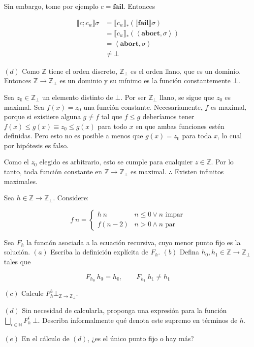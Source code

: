 \documentclass[a4paper, 12pt]{article}
\begin{document}
Sin embargo, tome por ejemplo $c = \textbf{fail}$. Entonces 

\begin{align*}
  \llbracket c;c_w \rrbracket\sigma 
  &= \llbracket c_w \rrbracket_*\left( \llbracket \textbf{fail} \rrbracket\sigma
  \right)  \\ 
  &= \llbracket c_w \rrbracket_*\left( \left<\textbf{abort}, \sigma \right>
  \right)  \\ 
  &= \left<\textbf{abort}, \sigma \right> \\ 
  &\neq \bot 
\end{align*}

$(d)$ Como $\mathbb{Z}$ tiene el orden discreto, $\mathbb{Z}_\bot $ es el orden
llano, que es un dominio. Entonces $\mathbb{Z} \to \mathbb{Z}_\bot$ es un
dominio y su mínimo es la función constantemente $\bot $.

Sea $z_0 \in \mathbb{Z}_\bot$ un elemento distinto de $\bot$. Por ser
$\mathbb{Z}_\bot $ llano, se sigue que $z_0$ es maximal. Sea $f(x) = z_0$ una
función constante. Necesariamente, $f$ es maximal, porque si existiere alguna $g
\neq f$ tal que $f \leq g$ deberíamos tener $f(x) \leq g(x) \equiv z_0 \leq
g(x)$ para todo $x$ en que ambas funciones estén definidas. Pero esto no es
posible a menos que $g(x) = z_0$ para toda $x$, lo cual por hipótesis es falso.

Como el $z_0$ elegido es arbitrario, esto se cumple para cualquier $z \in
\mathbb{Z}$. Por lo tanto, toda función constante en $\mathbb{Z} \to
\mathbb{Z}_\bot$ es maximal. $\therefore $ Existen infinitos maximales.

\pagebreak 

\begin{myframe}
  Sea $h \in \mathbb{Z} \to \mathbb{Z}_\bot $. Considere:

  \begin{equation*}
    f ~ n = \begin{cases}
      h ~ n & n \leq 0 \lor  n \text{ impar} \\ 
      f(n - 2) & n > 0 \land  n \text{ par}
    \end{cases}
  \end{equation*}

  Sea $F_h$ la función asociada a la ecuación recursiva, cuyo menor punto fijo
  es la solución. $(a)$ Escriba la definición explícita de $F_h$. $(b)$ Defina
  $h_0, h_1 \in \mathbb{Z} \to \mathbb{Z}_\bot $ tales que 

  \begin{equation*}
    F_{h_0} ~ h_0 = h_0, \qquad F_{h_1} ~ h_1 \neq h_1
  \end{equation*}

  $(c)$ Calcule $F_h^3 \bot_{\mathbb{Z}\to \mathbb{Z}_\bot }$. 

  $(d)$ Sin necesidad de calcularla, proponga una expresión para la función 
  $\bigsqcup_{i \in \mathbb{N}} F^i_h ~ \bot $. Describa informalmente qué
  denota este supremo en términos de $h$. 

  $(e)$ En el cálculo de $(d)$, ¿es el único punto fijo o hay más?
\end{myframe}
\end{document}
